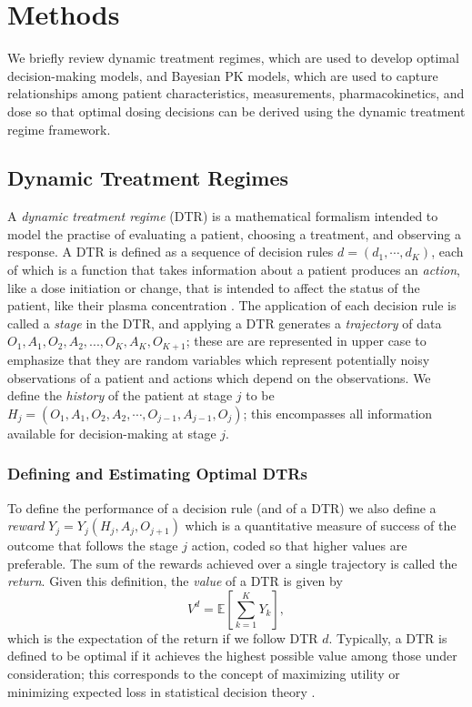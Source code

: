 \section{Methods}\label{ss:background}

We briefly review dynamic treatment regimes, which are used to develop optimal decision-making models, and Bayesian PK models, which are used to capture relationships among patient characteristics, measurements, pharmacokinetics, and dose so that optimal dosing decisions can be derived using the dynamic treatment regime framework.

\subsection{Dynamic Treatment Regimes}

A \textit{dynamic treatment regime} (DTR) is a mathematical formalism intended to model the practise of evaluating a patient, choosing a treatment, and observing a response. A DTR is defined as a sequence of decision rules $d = (d_1, \cdots, d_K)$, each of which is a function that takes information about a patient produces an \textit{action}, like a dose initiation or change, that is intended to affect the status of the patient, like their plasma concentration \cite{chakraborty2013statistical,lizotte17reinforcement,tsiatis2019dynamic}. The application of each decision rule is called a \textit{stage} in the DTR, and applying a DTR generates a \textit{trajectory} of data $O_1, A_1, O_2, A_2, ..., O_K, A_K, O_{K+1}$; these are are represented in upper case to emphasize that they are random variables which represent potentially noisy observations of a patient and actions which depend on the observations. We define the \textit{history} of the patient at stage $j$ to be $ H_j = (O_1, A_1, O_2, A_2, \cdots , O_{j-1}, A_{j-1}, O_j)$; this encompasses all information available for decision-making at stage $j$. 

\subsubsection{Defining and Estimating Optimal DTRs}

To define the performance of a decision rule (and of a DTR) we also define a \textit{reward} $ Y_j = Y_j(H_j, A_j, O_{j+1})$ which is a quantitative measure of success of the outcome that follows the stage $j$ action, coded so that higher values are preferable. The sum of the rewards achieved over a single trajectory is called the \textit{return}.  Given this definition, the \textit{value} of a DTR is given by
\begin{equation}
	V^d = \mathbb{E}\left[ \sum_{k=1}^K Y_k \right],
\end{equation}
which is the expectation of the return if we follow DTR $d$. Typically, a DTR is defined to be optimal if it achieves the highest possible value among those under consideration; this corresponds to the concept of maximizing utility or minimizing expected loss in statistical decision theory \cite{berger2013statistical}.

